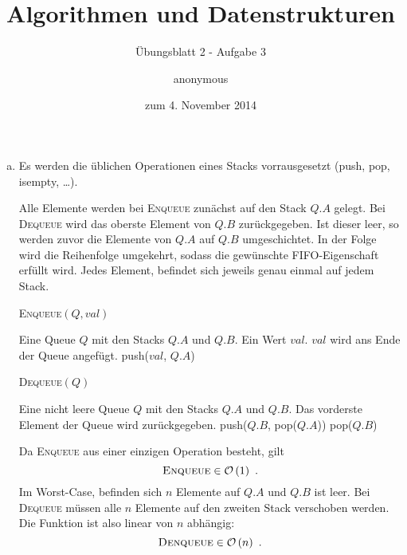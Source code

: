 \documentclass[a4paper]{scrartcl}
\title{Algorithmen und Datenstrukturen}
\subtitle{Übungsblatt 2 - Aufgabe 3}
\author{
    anonymous
}
\date{zum 4. November 2014}
\begin{document}
\maketitle

\begin{enumerate}[(a)]
    \item
        Es werden die üblichen Operationen eines Stacks vorrausgesetzt
        (push, pop, isempty, \ldots).

        Alle Elemente werden bei \textsc{Enqueue} zunächst auf den Stack $Q.A$
        gelegt.
        Bei \textsc{Dequeue} wird das oberste Element von $Q.B$ zurückgegeben.
        Ist dieser leer, so werden zuvor die Elemente von $Q.A$ auf $Q.B$
        umgeschichtet.
        In der Folge wird die Reihenfolge umgekehrt, sodass die gewünschte
        FIFO-Eigenschaft erfüllt wird.
        Jedes Element, befindet sich jeweils genau einmal auf jedem Stack.

        \begin{algorithm}
            \caption{\textsc{Enqueue}$(Q, val)$}
            \begin{algorithmic}[1]
            \Require Eine Queue $Q$ mit den Stacks $Q.A$ und $Q.B$.
                Ein Wert $val$.
            \Ensure $val$ wird ans Ende der Queue angefügt.
            \State push($val$, $Q.A$)
            \end{algorithmic}
        \end{algorithm}

        \begin{algorithm}
            \caption{\textsc{Dequeue}$(Q)$}
            \begin{algorithmic}[1]
            \Require Eine nicht leere Queue $Q$ mit den Stacks $Q.A$ und $Q.B$.
            \Ensure Das vorderste Element der Queue wird zurückgegeben.
                    \State push($Q.B$, pop($Q.A$))
                \EndWhile
            \EndIf
            \State \Return pop($Q.B$)
            \end{algorithmic}
        \end{algorithm}
        Da \textsc{Enqueue} aus einer einzigen Operation besteht, gilt
        \begin{equation}
            \textsc{Enqueue} \in \mathcal{O}\left( 1 \right) \text{ .}
        \end{equation}
        Im Worst-Case, befinden sich $n$ Elemente auf $Q.A$ und $Q.B$ ist leer.
        Bei \textsc{Dequeue} müssen alle $n$ Elemente auf den zweiten Stack
        verschoben werden.
        Die Funktion ist also linear von $n$ abhängig:
        \begin{equation}
            \textsc{Denqueue} \in \mathcal{O}\left( n \right) \text{ .}
        \end{equation}
        

\end{enumerate}
\end{document}
